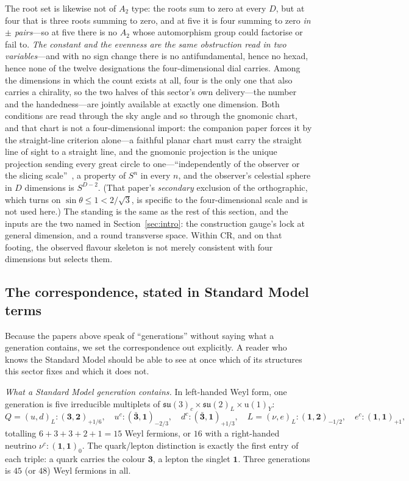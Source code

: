 \documentclass[11pt]{article}
\newcommand{\su}{\mathfrak{su}}
\begin{document}
The root set is likewise not of $A_{2}$ type: the roots sum to zero at every $D$, but at four that is three roots summing to zero, and at five it is four summing to zero \emph{in $\pm$ pairs}---so at five there is no $A_{2}$ whose automorphism group could factorise or fail to. \emph{The constant and the evenness are the same obstruction read in two variables}---and with no sign change there is no antifundamental, hence no hexad, hence none of the twelve designations the four-dimensional dial carries. Among the dimensions in which the count exists at all, four is the only one that also carries a chirality, so the two halves of this sector's own delivery---the number and the handedness---are jointly available at exactly one dimension. Both conditions are read through the sky angle and so through the gnomonic chart, and that chart is not a four-dimensional import: the companion paper forces it by the straight-line criterion alone---a faithful planar chart must carry the straight line of sight to a straight line, and the gnomonic projection is the unique projection sending every great circle to one---``independently of the observer or the slicing scale''~\cite{JanzenSlicing}, a property of $S^{n}$ in every $n$, and the observer's celestial sphere in $D$ dimensions is $S^{D-2}$. (That paper's \emph{secondary} exclusion of the orthographic, which turns on $\sin\theta\le1<2/\sqrt3$, is specific to the four-dimensional scale and is not used here.) The standing is the same as the rest of this section, and the inputs are the two named in Section~\ref{sec:intro}: the construction gauge's lock at general dimension, and a round transverse space. Within CR, and on that footing, the observed flavour skeleton is not merely consistent with four dimensions but selects them.

\subsection{The correspondence, stated in Standard Model terms}\label{sec:correspondence}

Because the papers above speak of ``generations'' without saying what a generation contains, we set the
correspondence out explicitly. A reader who knows the Standard Model should be able to see at once which of its
structures this sector fixes and which it does not.

\emph{What a Standard Model generation contains.} In left-handed Weyl form, one generation is five irreducible
multiplets of $\su(3)_c\times\su(2)_L\times\mathrm{u}(1)_Y$:
\[
Q=(u,d)_L:(\mathbf{3},\mathbf{2})_{+1/6},\quad
u^{c}:(\bar{\mathbf{3}},\mathbf{1})_{-2/3},\quad
d^{c}:(\bar{\mathbf{3}},\mathbf{1})_{+1/3},\quad
L=(\nu,e)_L:(\mathbf{1},\mathbf{2})_{-1/2},\quad
e^{c}:(\mathbf{1},\mathbf{1})_{+1},
\]
totalling $6+3+3+2+1=15$ Weyl fermions, or $16$ with a right-handed neutrino
$\nu^{c}:(\mathbf{1},\mathbf{1})_{0}$. The quark/lepton distinction is exactly the first entry of each triple:
a quark carries the colour $\mathbf{3}$, a lepton the singlet $\mathbf{1}$. Three generations is $45$ (or $48$)
Weyl fermions in all.
\end{document}
